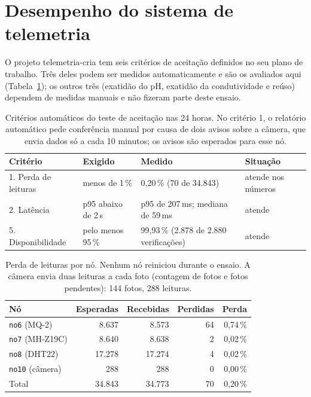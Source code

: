 \documentclass[11pt,a4paper]{article}
\newcommand{\no}[1]{\texttt{#1}}
\begin{document}
\section{Desempenho do sistema de telemetria}
\label{sec:telemetria}

O projeto telemetria-cria tem seis critérios de aceitação definidos no seu plano de trabalho. Três deles podem ser medidos automaticamente e são os avaliados aqui (Tabela~\ref{tab:criterios}); os outros três (exatidão do pH, exatidão da condutividade e reúso) dependem de medidas manuais e não fizeram parte deste ensaio.

\begin{table}[H]
\centering\small
\begin{tabularx}{\linewidth}{@{}lllX@{}}
\toprule
\textbf{Critério} & \textbf{Exigido} & \textbf{Medido} & \textbf{Situação} \\
\midrule
1. Perda de leituras & menos de 1\,\% & 0,20\,\% (70 de 34.843) & atende nos números \\
2. Latência & p95 abaixo de 2\,s & p95 de 207\,ms; mediana de 59\,ms & atende \\
5. Disponibilidade & pelo menos 95\,\% & 99,93\,\% (2.878 de 2.880 verificações) & atende \\
\bottomrule
\end{tabularx}
\caption{Critérios automáticos do teste de aceitação nas 24 horas. No critério 1, o relatório automático pede conferência manual por causa de dois avisos sobre a câmera, que envia dados só a cada 10 minutos; os avisos são esperados para esse nó.}
\label{tab:criterios}
\end{table}

\begin{table}[H]
\centering\small
\begin{tabular}{@{}lrrrr@{}}
\toprule
\textbf{Nó} & \textbf{Esperadas} & \textbf{Recebidas} & \textbf{Perdidas} & \textbf{Perda} \\
\midrule
\no{no6} (MQ-2) & 8.637 & 8.573 & 64 & 0,74\,\% \\
\no{no7} (MH-Z19C) & 8.640 & 8.638 & 2 & 0,02\,\% \\
\no{no8} (DHT22) & 17.278 & 17.274 & 4 & 0,02\,\% \\
\no{no10} (câmera) & 288 & 288 & 0 & 0,00\,\% \\
\midrule
Total & 34.843 & 34.773 & 70 & 0,20\,\% \\
\bottomrule
\end{tabular}
\caption{Perda de leituras por nó. Nenhum nó reiniciou durante o ensaio. A câmera envia duas leituras a cada foto (contagem de fotos e fotos pendentes): 144 fotos, 288 leituras.}
\label{tab:perda}
\end{table}
\end{document}
